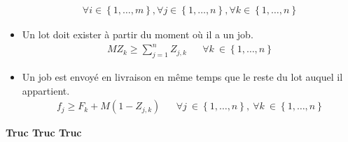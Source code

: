 \documentclass{article}
\begin{document}
\begin{itemize}
\begin{align}
                    \forall i \in\left\{1,\dotsc, m \right\},
                    \forall j \in\left\{1,\dotsc, n \right\},
                    \forall k \in\left\{1,\dotsc, n \right\}
            	\end{align}
            \item
            	Un lot doit exister à partir du moment où il a un job.
            	\begin{align}
                    MZ_k\geq\sum_{j=1}^{n}Z_{j,k} &&
                    \forall k\ \in\left\{1,\dotsc,n \right\}
            	\end{align}
            \item
        	Un job est envoyé en livraison en même temps que le reste du lot auquel il appartient.
                \begin{align}
                    f_j\geq F_k+M\left(1-Z_{j,k}\right) &&
                    \forall j\ \in\left\{1,\dotsc,n\right\},\ \forall k\ \in\left\{1,\dotsc,n\right\}
                \end{align}
        \end{itemize}
    	
        
        \textbf{ Truc Truc Truc }
        
        
\end{document}
